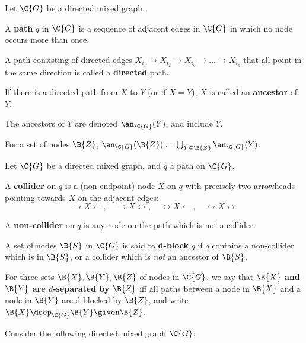 \documentclass{article}
\newcommand\alert[1]{\textbf{#1}}
\begin{document}
  \begin{definition}
  Let $\C{G}$ be a directed mixed graph.
    \begin{compactitem}
      \item A \alert{path} $q$ in $\C{G}$ is a sequence of adjacent edges in $\C{G}$ in which no node occurs more than once.
      \item A path consisting of directed edges $X_{i_1} \to X_{i_2} \to X_{i_3} \to \dots \to X_{i_k}$ that all point in the same direction is called a \alert{directed} path.
      \item If there is a directed path from $X$ to $Y$ (or if $X=Y$), $X$ is called an \alert{ancestor} of $Y$.
      \item The ancestors of $Y$ are denoted \alert{$\an_{\C{G}}(Y)$}, and include $Y$.
      \item For a set of nodes $\B{Z}$, $\an_{\C{G}}(\B{Z}) := \bigcup_{Y \in \B{Z}} \an_{\C{G}}(Y)$.
    \end{compactitem}
  \end{definition}
  \begin{definition}
    Let $\C{G}$ be a directed mixed graph, and $q$ a path on $\C{G}$.
    \begin{compactitem}
      \item A \alert{collider} on $q$ is a (non-endpoint) node $X$ on $q$ with precisely two arrowheads pointing towards $X$ on the adjacent edges:\hfil
    $$\rightarrow X \leftarrow, \quad \rightarrow X \leftrightarrow, \quad \leftrightarrow X \leftarrow, \quad \leftrightarrow X \leftrightarrow$$
     \item A \alert{non-collider} on $q$ is any node on the path which is not a collider.
    \end{compactitem}

    A set of nodes $\B{S}$ in $\C{G}$ is said to \alert{d-block} $q$ if $q$ contains
    a non-collider which is in $\B{S}$, or a collider which is \emph{not} an ancestor of $\B{S}$.

    For three sets $\B{X},\B{Y},\B{Z}$ of nodes in $\C{G}$, we say that
    \alert{$\B{X}$ and $\B{Y}$ are $d$-separated by $\B{Z}$} iff all paths between a node in $\B{X}$ and a node in $\B{Y}$ are d-blocked by $\B{Z}$, and write \alert{$\B{X} \dsep_{\C{G}} \B{Y} \given \B{Z}$}.
  \end{definition}
    
  \noindent Consider the following directed mixed graph $\C{G}$:\\
\end{document}
